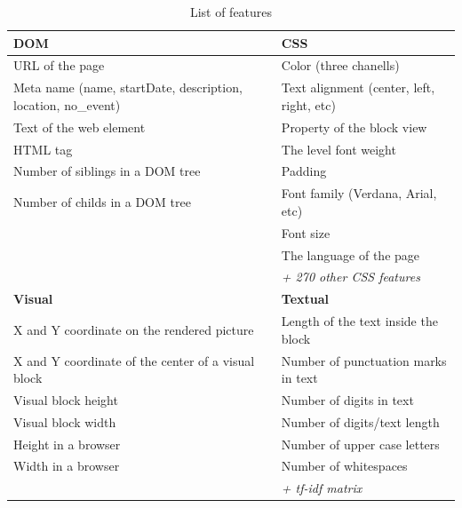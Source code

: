 \begin{table}[h]
\begin{center}
{\renewcommand{\arraystretch}{1.2}
\begin{tabular}{| p{6cm} | p{6cm} |}
\hline
\textbf{DOM}   &   \textbf{CSS}\\
\hline
URL of the page    &    Color (three chanells)\\
Meta name (name, startDate, description, location, no\_event)    &    Text alignment (center, left, right, etc)    \\
Text of the web element    &    Property of the block view    \\
HTML tag    &    The level font weight    \\
Number of siblings in a DOM tree    &    Padding    \\
Number of childs in a DOM tree    &    Font family (Verdana, Arial, etc)    \\
    &    Font size \\
    &    The language of the page \\
    
    &    \textit{+ 270 other CSS features} \\
\hline
\textbf{Visual}   &   \textbf{Textual}  \\
\hline
X and Y coordinate on the rendered picture    &    Length of the text inside the block    \\
X and Y coordinate of the center of a visual block    &    Number of punctuation marks in text    \\
Visual block height     &    Number of digits in text    \\
Visual block width        &    Number of digits/text length    \\
Height in a browser     &    Number of upper case letters    \\
Width in a browser     &    Number of whitespaces    \\

     &    \textit{+ tf-idf matrix}    \\
\hline
\end{tabular}}
\caption{List of features}
\label{table:featurelist}
\end{center}
\end{table}    



